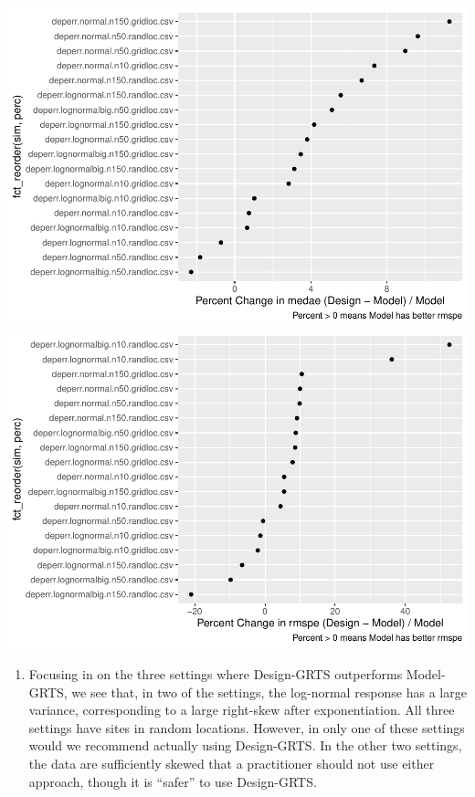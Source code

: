 \documentclass[]{elsarticle} %
\providecommand{\tightlist}{%
  \setlength{\itemsep}{0pt}\setlength{\parskip}{0pt}}
\begin{document}
\includegraphics{SpatialDVM_Manuscript_files/figure-latex/unnamed-chunk-4-1.pdf}
\includegraphics{SpatialDVM_Manuscript_files/figure-latex/unnamed-chunk-4-2.pdf}

\begin{enumerate}
\def\labelenumi{\arabic{enumi}.}
\setcounter{enumi}{2}
\tightlist
\item
  Focusing in on the three settings where Design-GRTS outperforms
  Model-GRTS, we see that, in two of the settings, the log-normal
  response has a large variance, corresponding to a large right-skew
  after exponentiation. All three settings have sites in random
  locations. However, in only one of these settings would we recommend
  actually using Design-GRTS. In the other two settings, the data are
  sufficiently skewed that a practitioner should not use either
  approach, though it is ``safer'' to use Design-GRTS.
\end{enumerate}
\end{document}
